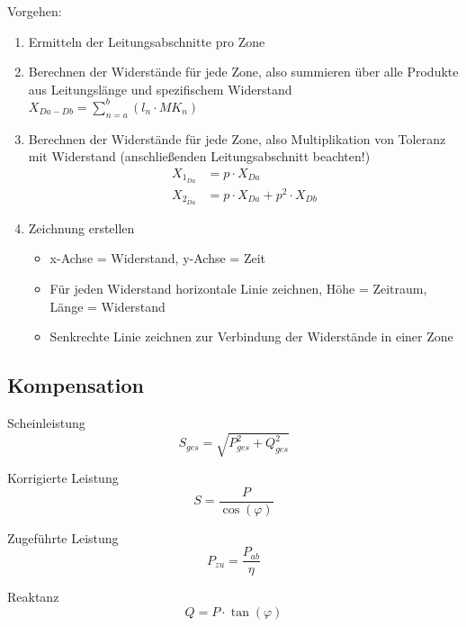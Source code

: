 \documentclass[11pt, a4paper, draft, fleqn, twocolumn]{article}
\numberwithin{equation}{subsection}
\begin{document}
Vorgehen:
\begin{enumerate}
    \item Ermitteln der Leitungsabschnitte pro Zone
    \item Berechnen der Widerstände für jede Zone, also summieren über alle Produkte aus Leitungslänge und spezifischem Widerstand \\ \(X_{Da-Db} = \sum_{n=a}^{b} (l_n \cdot MK_n) \)
    \item Berechnen der Widerstände für jede Zone, also Multiplikation von Toleranz mit Widerstand (anschließenden Leitungsabschnitt beachten!) \\
    \begin{equation}
    \begin{split}
        X_{1_{Da}} & = p \cdot X_{Da} \\
        X_{2_{Da}} & = p \cdot X_{Da} + p^2 \cdot X_{Db}
    \end{split}
    \end{equation}
    \item Zeichnung erstellen
    \begin{itemize}
        \item x-Achse = Widerstand, y-Achse = Zeit
        \item Für jeden Widerstand horizontale Linie zeichnen, Höhe = Zeitraum, Länge = Widerstand
        \item Senkrechte Linie zeichnen zur Verbindung der Widerstände in einer Zone
    \end{itemize}
\end{enumerate}


\subsection{Kompensation}

Scheinleistung
\begin{equation}
    S_{ges} = \sqrt{P_{ges}^2 +Q_{ges}^2}
\end{equation}

\noindent Korrigierte Leistung
\begin{equation}
    S = \frac{P}{\cos(\varphi)}
\end{equation}

\noindent Zugeführte Leistung
\begin{equation}
    P_{zu} = \frac{P_{ab}}{\eta}
\end{equation}

\noindent Reaktanz
\begin{equation}
    Q = P \cdot \tan(\varphi)
\end{equation}
\end{document}
